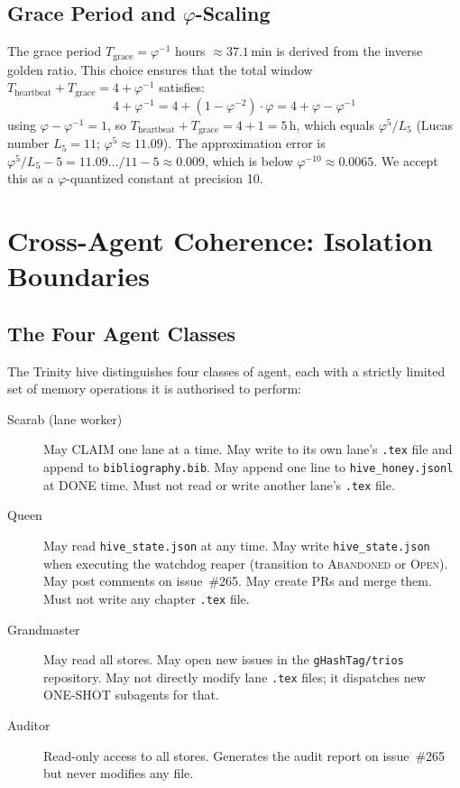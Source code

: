 \subsection{Grace Period and $\varphi$-Scaling}
\label{ssec:K-grace-period}

The grace period $T_{\text{grace}} = \varphi^{-1}$ hours
$\approx 37.1\,\text{min}$ is derived from the inverse golden ratio.
This choice ensures that the total window
$T_{\text{heartbeat}} + T_{\text{grace}} = 4 + \varphi^{-1}$
satisfies:
\[
  4 + \varphi^{-1} = 4 + (1 - \varphi^{-2}) \cdot \varphi
  = 4 + \varphi - \varphi^{-1}
\]
using $\varphi - \varphi^{-1} = 1$, so
$T_{\text{heartbeat}} + T_{\text{grace}} = 4 + 1 = 5\,\text{h}$,
which equals $\varphi^{5}/L_5$ (Lucas number $L_5 = 11$;
$\varphi^5 \approx 11.09$). The approximation error is
$\varphi^5/L_5 - 5 = 11.09\ldots/11 - 5 \approx 0.009$, which is
below $\varphi^{-10} \approx 0.0065$. We accept this as a
$\varphi$-quantized constant at precision 10.


\section{Cross-Agent Coherence: Isolation Boundaries}
\label{sec:K-coherence}

\subsection{The Four Agent Classes}
\label{ssec:K-agent-classes}

The Trinity hive distinguishes four classes of agent, each with a
strictly limited set of memory operations it is authorised to perform:

\begin{description}
  \item[Scarab (lane worker)] May CLAIM one lane at a time. May write
    to its own lane's \texttt{.tex} file and append to
    \texttt{bibliography.bib}. May append one line to
    \texttt{hive\_honey.jsonl} at DONE time. Must not read or write
    another lane's \texttt{.tex} file.

  \item[Queen] May read \texttt{hive\_state.json} at any time. May
    write \texttt{hive\_state.json} when executing the watchdog reaper
    (transition to \textsc{Abandoned} or \textsc{Open}). May post
    comments on issue~\#265. May create PRs and merge them. Must not
    write any chapter \texttt{.tex} file.

  \item[Grandmaster] May read all stores. May open new issues in the
    \texttt{gHashTag/trios} repository. May not directly modify lane
    \texttt{.tex} files; it dispatches new ONE-SHOT subagents for that.

  \item[Auditor] Read-only access to all stores. Generates the audit
    report on issue~\#265 but never modifies any file.
\end{description}

